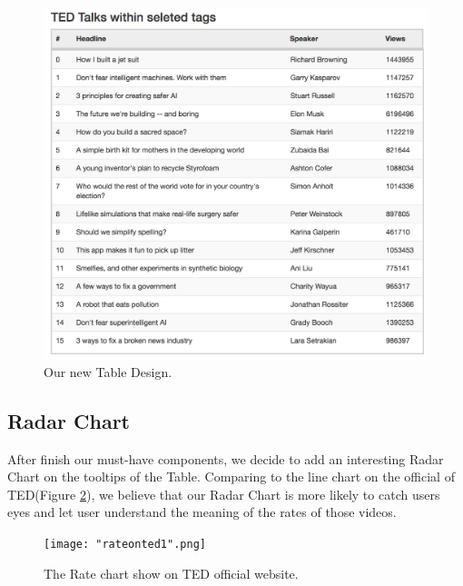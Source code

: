 \documentclass{report}
\numberwithin{figure}{section}
\begin{document}
\begin{figure}
\begin{center}
\includegraphics[scale=0.2]{newtable}
\caption{Our new Table Design.}
\label{fig:newtable}
\end{center}
\end{figure} 

\subsection{Radar Chart}
\quad After finish our must-have components, we decide to add an interesting Radar Chart on the tooltips of the Table. Comparing to the line chart on the official of TED(Figure \ref{fig:rateonted}), we believe that our Radar Chart is more likely to catch users eyes and let user understand the meaning of the rates of those videos.

\begin{figure}
\begin{center}
\texttt{[image: "rateonted1".png]}
\caption{The Rate chart show on TED official website.}
\label{fig:rateonted}
\end{center}
\end{figure} 
\end{document}
